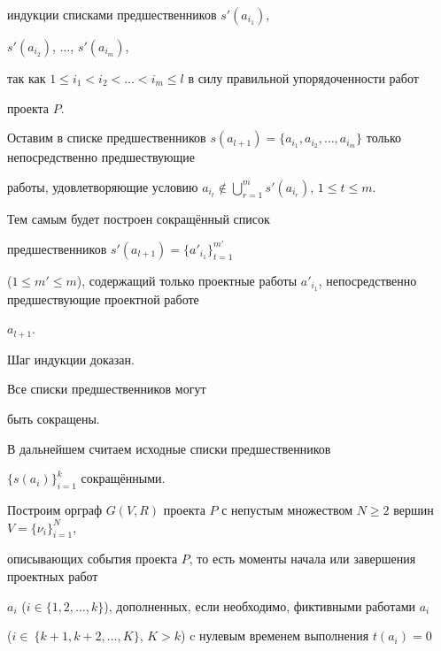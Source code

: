 \begin{description}
\begin{itemize}
индукции списками предшественников $s'(a_{i_1})$,

$s'(a_{i_2})$, $\dots$, $s'(a_{i_{m}})$, 

так как $1\leq i_1<i_2<\dots<i_{m}\leq l$ в силу правильной упорядоченности работ

проекта $P$. 

Оставим в списке предшественников $s(a_{l+1})=\{ a_{i_1},

a_{i_2}, \dots, a_{i_{m}} \}$ только непосредственно предшествующие

 работы, удовлетворяющие условию $a_{i_t} \notin \bigcup_{r=1}^m s'(a_{i_{r}})$, $1\leq t \leq m$. 

 Тем самым  будет построен сокращённый список

 предшественников $s'(a_{l+1})=\{a'_{i_1} \}^{m'}_{t=1}$

 ($1\leq m'\leq m$), содержащий только проектные работы  $a'_{i_1}$, непосредственно предшествующие проектной работе

 $a_{l+1}$.

\end{itemize}

 Шаг индукции доказан.



\item[{\sf Заключение индукции.}] Все списки предшественников могут

быть сокращены.



\end{description} 







В дальнейшем считаем исходные списки предшественников

$\{s(a_i)\}^{k}_{i=1}$ сокращёнными.






Построим орграф $G(V,R)$ проекта $P$ с непустым множеством $N\geq 2$ вершин $V=\{\nu_i\}^{N}_{i=1}$,

описывающих события проекта $P$, то есть моменты начала или завершения проектных работ 

$a_i$ ($i\in \{1, 2, \dots, k\}$), дополненных, если необходимо, фиктивными работами $a_i$

($i \in \ \{k+1, k+2, \dots, K\}$,  $K>k$) c нулевым временем выполнения $t(a_i)=0$ 

